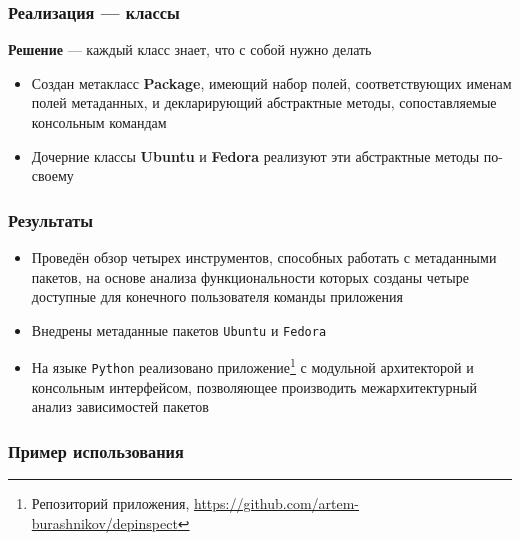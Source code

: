 \documentclass{beamer}
\begin{document}
\begin{frame}[t]
	\frametitle{Реализация --- классы}
	\textbf{Решение} --- каждый класс знает, что с собой нужно делать
	\begin{itemize}
		\item Создан метакласс \textbf{Package}, имеющий набор полей, соответствующих именам полей метаданных, и декларирующий абстрактные методы, сопоставляемые консольным командам
		\item Дочерние классы \textbf{Ubuntu} и \textbf{Fedora} реализуют эти абстрактные методы по-своему
	\end{itemize}
\end{frame}

\begin{frame}
	\frametitle{Результаты}
	\begin{itemize}
		\item Проведён обзор четырех инструментов, способных работать с метаданными пакетов, на основе анализа функциональности которых созданы четыре доступные для конечного пользователя команды приложения
		\item Внедрены метаданные пакетов \texttt{Ubuntu} и \texttt{Fedora}
		\item На языке \texttt{Python} реализовано приложение\footnote{Репозиторий приложения, \href{https://github.com/artem-burashnikov/depinspect}{https://github.com/artem-burashnikov/depinspect}} с модульной архитекторой и консольным интерфейсом, позволяющее производить межархитектурный анализ зависимостей пакетов
	\end{itemize}
\end{frame}

\appendix

\begin{frame}
	\frametitle{Пример использования}
	\begin{figure}[ht]
		\raggedright
		
	\end{figure}
\end{frame}
\end{document}
